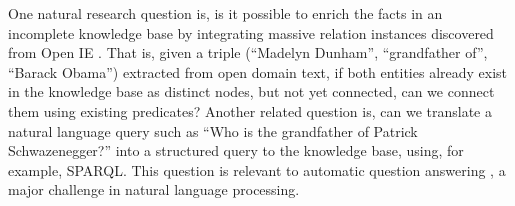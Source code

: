One natural research question is,
is it possible to enrich the facts in an incomplete knowledge base by
integrating massive relation instances discovered from Open IE
\cite{gardner2015efficient,lao2010relational,lao2011random}.
That is, given a triple (``Madelyn Dunham'', ``grandfather of'',
``Barack Obama'') extracted from open domain text,
if both entities already exist in the knowledge
base as distinct nodes, but not yet connected, can we connect them
using existing predicates?
Another related question is, can we translate a natural language
query such as ``Who is the grandfather of Patrick Schwazenegger?''
into a structured query to the knowledge base, using,
for example, SPARQL.
This question is relevant to automatic question answering
\cite{berant2013semantic,berant2014semantic,yao2014information,zou2014natural},
a major challenge in natural language processing.

